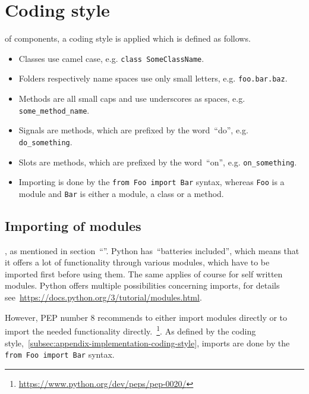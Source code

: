 \documentclass[%
    a4paper,    %
    justified,  %
    nobib,      %
    openany     %
]{tufte-book}
\begin{document}
\section{Coding style}
\label{appendix:sec:coding-style}

 of components, a
coding style is applied which is defined as follows.

\begin{itemize}
  \item Classes use camel case, e.g. \verb+class SomeClassName+.
  \item Folders respectively name spaces use only small letters, e.g.
    \verb+foo.bar.baz+.
  \item Methods are all small caps and use underscores as spaces, e.g.
    \verb+some_method_name+.
  \item Signals are methods, which are prefixed by the word~\enquote{do}, e.g.
    \verb+do_something+.
  \item Slots are methods, which are prefixed by the word~\enquote{on}, e.g.
    \verb+on_something+.
  \item Importing is done by the \verb+from Foo import Bar+ syntax, whereas
    \verb+Foo+ is a module and \verb+Bar+ is either a module, a class or a
    method.
\end{itemize}

\subsection{Importing of modules}
\label{appendix:subsec:imports}

, as mentioned
in section~\enquote{}.
Python has~\enquote{batteries included}, which means that it offers a lot of
functionality through various modules, which have to be imported first before
using them. The same applies of course for self written modules. Python offers
multiple possibilities concerning imports, for details
see~\url{https://docs.python.org/3/tutorial/modules.html}. 

However, PEP number 8 recommends to either import modules directly or to import
the needed functionality
directly.~\footnote{\url{https://www.python.org/dev/peps/pep-0020/}}. As defined
by the coding style,~\autoref{subsec:appendix-implementation-coding-style},
imports are done by the \verb+from Foo import Bar+ syntax.
\end{document}
